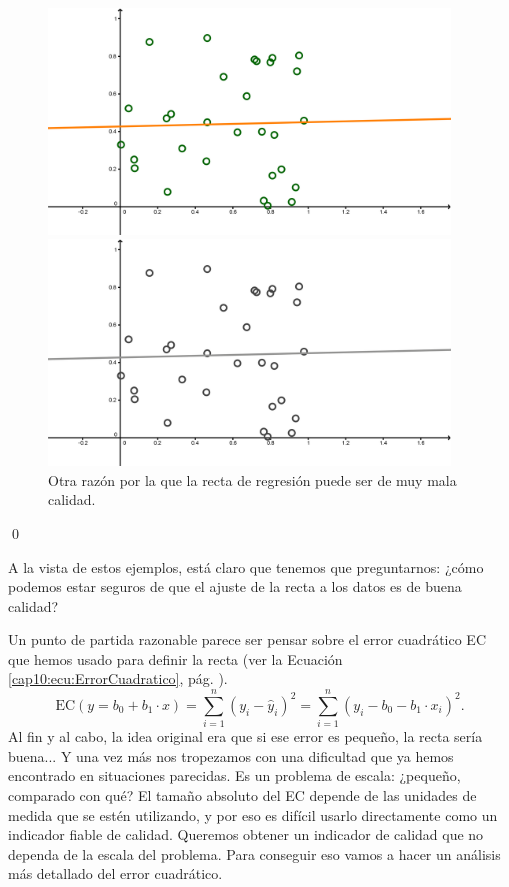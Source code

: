 \begin{ejemplo}
\begin{figure}[ht]
\begin{center}
\begin{enColor}
\includegraphics[height=6cm]{../fig/Cap10-EjemploRectaMalaAproximacion02.png}
\end{enColor}
\begin{bn}
\includegraphics[height=6cm]{../fig/Cap10-EjemploRectaMalaAproximacion02-bn.png}
\end{bn}
\caption{Otra razón por la que la recta de regresión puede ser de muy mala calidad.}
\label{cap10:fig:EjemploRectaMalaAproximacion02}
\end{center}
\end{figure}

\qed
\end{ejemplo}


A la vista de estos ejemplos, está claro que tenemos que preguntarnos: ¿cómo podemos estar seguros de que el ajuste de la recta a los datos es de buena calidad?

Un punto de partida razonable parece ser pensar sobre el error cuadrático EC que hemos usado para definir la recta (ver la Ecuación \ref{cap10:ecu:ErrorCuadratico}, pág. \pageref{cap10:ecu:ErrorCuadratico}).
\[\mbox{EC}(y=b_0+b_1\cdot x)=\sum_{i=1}^n(y_i-\hat y_i)^2 = \sum_{i=1}^n(y_i-b_0-b_1\cdot x_i)^2.\]
Al fin y al cabo, la idea original era que si ese error es pequeño, la recta sería buena...
Y una vez más nos tropezamos con una dificultad que ya hemos encontrado en situaciones parecidas. Es un problema de escala: ¿pequeño, comparado con qué? El tamaño absoluto del EC depende de las
unidades de medida que se estén utilizando, y por eso es difícil usarlo directamente como
un indicador fiable de calidad. Queremos obtener un indicador de calidad que no dependa
de la escala del problema. Para conseguir eso vamos a hacer un análisis más detallado del error cuadrático.

